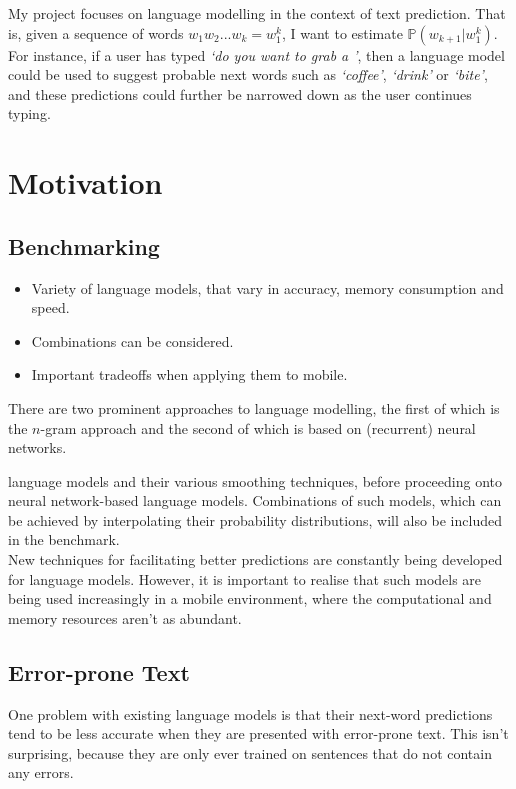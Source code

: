 \documentclass[a4paper, 12pt]{report}
\newcommand{\tit}[1]{\textit{#1}}
\begin{document}
My project focuses on language modelling in the context of text prediction. That is, given a sequence of words $w_1w_2...w_k = w_1^k$, I want to estimate $\mathbb{P}(w_{k + 1} | w_1^k)$. For instance, if a user has typed \tit{`do you want to grab a '}, then a language model could be used to suggest probable next words such as \tit{`coffee'}, \tit{`drink'} or \tit{`bite'}, and these predictions could further be narrowed down as the user continues typing.

\section{Motivation}


\subsection*{Benchmarking}

\begin{itemize}
\item
	Variety of language models, that vary in accuracy, memory consumption and speed.
\item
	Combinations can be considered.
\item
	Important tradeoffs when applying them to mobile.
\end{itemize}

There are two prominent approaches to language modelling, the first of which is the $n$-gram approach and the second of which is based on (recurrent) neural networks.

 language models and their various smoothing techniques, before proceeding onto neural network-based language models. Combinations of such models, which can be achieved by interpolating their probability distributions, will also be included in the benchmark. \\

New techniques for facilitating better predictions are constantly being developed for language models. However, it is important to realise that such models are being used increasingly in a mobile environment, where the computational and memory resources aren't as abundant.

\subsection*{Error-prone Text}

One problem with existing language models is that their next-word predictions tend to be less accurate when they are presented with error-prone text. This isn't surprising, because they are only ever trained on sentences that do not contain any errors.
\end{document}
